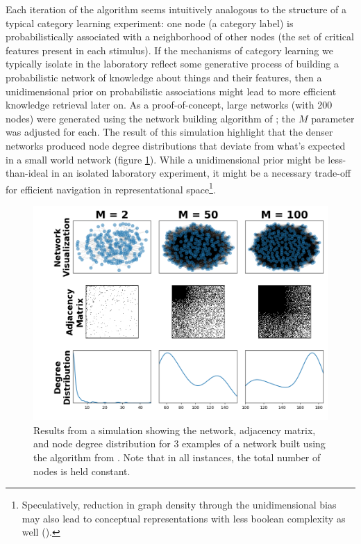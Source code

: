 \documentclass[12pt]{article}
\let\oldcite=\cite
\let\oldtextcite=\textcite
\renewcommand{\cite}[1]{\textcolor[rgb]{0, .121, .388}{\oldcite{#1}}}
\renewcommand{\textcite}[1]{\textcolor[rgb]{0, .121, .388}{\oldtextcite{#1}}}
\begin{document}
Each iteration of the \textcite{steyvers2005large} algorithm seems intuitively analogous to the structure of a typical category learning experiment: one node (a category label) is probabilistically associated with a neighborhood of other nodes (the set of critical features present in each stimulus). If the mechanisms of category learning we typically isolate in the laboratory reflect some generative process of building a probabilistic network of knowledge about things and their features, then a unidimensional prior on probabilistic associations might lead to more efficient knowledge retrieval later on. As a proof-of-concept, large networks (with 200 nodes) were generated using the network building algorithm of \textcite{steyvers2005large}; the \(M\) parameter was adjusted for each. The result of this simulation highlight that the denser networks produced node degree distributions that deviate from what's expected in a small world network (figure \ref{fig:small_world_simulation}). While a unidimensional prior might be less-than-ideal in an isolated laboratory experiment, it might be a necessary trade-off for efficient navigation in representational space\footnote{Speculatively, reduction in graph density through the unidimensional bias may also lead to conceptual representations with less boolean complexity as well (\cite{feldman2000minimization}).}.

\begin{figure}[p]
    \centering
    \label{fig:small_world_simulation}
    \includegraphics[scale=.6]{figures/small_world_simulation.png}
    \caption{Results from a simulation showing the network, adjacency matrix, and node degree distribution for 3 examples of a network built using the algorithm from \textcite{steyvers2005large}. Note that in all instances, the total number of nodes is held constant.}
\end{figure}
\end{document}
